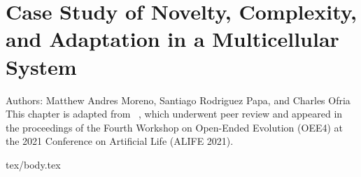 \chapter{Case Study of Novelty, Complexity, and Adaptation in a Multicellular System}
\label{ch:measuring-cna}

\noindent
Authors: Matthew Andres Moreno, Santiago Rodriguez Papa, and Charles Ofria \\
This chapter is adapted from ~\citep{moreno2021case}, which underwent peer review and appeared in the proceedings of the Fourth Workshop on Open-Ended Evolution (OEE4) at the 2021 Conference on Artificial Life (ALIFE 2021).

{tex/body.tex}
